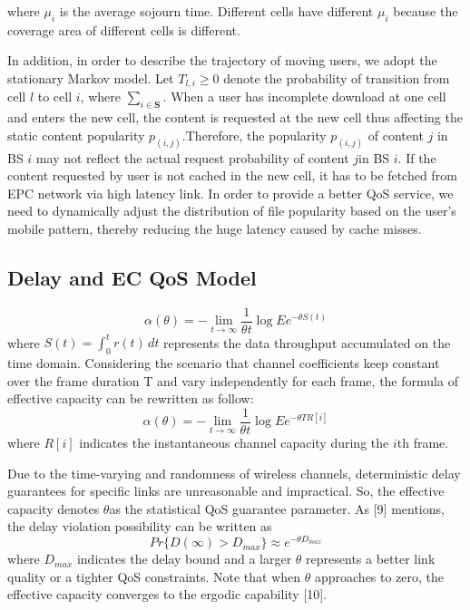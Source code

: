 \documentclass[conference]{IEEEtran}
\begin{document}
where $\mu_i$ is the average sojourn time. Different cells have different $\mu_i$ because the coverage area of different cells is different.

In addition, in order to describe the trajectory of moving users, we adopt the stationary Markov model. Let $T_{l,i}\ge 0$ denote the probability of transition from cell $l$ to cell $i$, where $\sum_{i\in\mathbf{S}}$. When a user has incomplete download at one cell and enters the new cell, the content is requested at the new cell thus affecting the static content popularity $p_(i,j)$.Therefore, the popularity $p_(i,j)$ of content $j$ in BS $i$ may not reflect the actual request probability of content $j $in BS $i$. If the content requested by user is not cached in the new cell, it has to be fetched from EPC network via high latency link. In order to provide a better QoS service, we need to dynamically adjust the distribution of file popularity based on the user's mobile pattern, thereby reducing the huge latency caused by cache misses.
\subsection{Delay and EC QoS Model}
\begin{equation}
\alpha(\theta)=-\lim_{t \to \infty}\frac{1}{\theta t}\log E{e^{-\theta S(t)}}
\end{equation}
where $S(t)=\int_{0}^{t} r(t)\, dt$ represents the data throughput accumulated on the time domain. Considering the scenario that channel coefficients keep constant over the frame duration T and vary independently for each frame, the formula of effective capacity can be rewritten as follow:
\begin{equation}
\alpha(\theta)=-\lim_{t \to \infty}\frac{1}{\theta t}\log E{e^{-\theta TR[i]}}
\end{equation}
where $R[i]$ indicates the instantaneous channel capacity during the $i$th frame.

Due to the time-varying and randomness of wireless channels, deterministic delay guarantees for specific links are unreasonable and impractical. So, the effective capacity denotes
$\theta$as the statistical QoS guarantee parameter. As [9] mentions, the delay violation possibility can be written as
\begin{equation}
Pr\{D(\infty)>D_{max}\}\approx e^{-\theta D_{max}}
\end{equation}
where $D_{max}$ indicates the delay bound and a larger $\theta$ represents a better link quality or a tighter QoS constraints. Note that when $\theta$ approaches to zero, the effective capacity converges to the ergodic capability [10].
\end{document}
